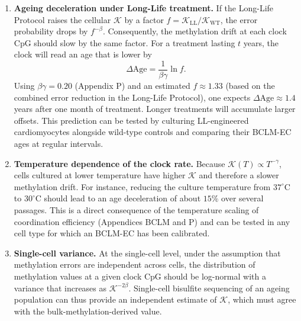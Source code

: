 \documentclass[12pt,a4paper]{article}
\newcommand{\REL}{\mathcal{K}}          %
\begin{document}
	\begin{enumerate}
		\item \textbf{Ageing deceleration under Long-Life treatment.}
		If the Long-Life Protocol raises the cellular \(\REL\) by a factor \(f = \REL_{\mathrm{LL}}/\REL_{\mathrm{WT}}\), the error probability drops by \(f^{-\beta}\). Consequently, the methylation drift at each clock CpG should slow by the same factor. For a treatment lasting \(t\) years, the clock will read an age that is lower by
		\[
		\Delta\mathrm{Age} = \frac{1}{\beta\gamma} \ln f.
		\]
		Using \(\beta\gamma = 0.20\) (Appendix P) and an estimated \(f \approx 1.33\) (based on the combined error reduction in the Long-Life Protocol), one expects \(\Delta\mathrm{Age} \approx 1.4\) years after one month of treatment. Longer treatments will accumulate larger offsets. This prediction can be tested by culturing LL-engineered cardiomyocytes alongside wild-type controls and comparing their BCLM-EC ages at regular intervals.
		
		\item \textbf{Temperature dependence of the clock rate.}
		Because \(\REL(T) \propto T^{-\gamma}\), cells cultured at lower temperature have higher \(\REL\) and therefore a slower methylation drift. For instance, reducing the culture temperature from \(37^\circ\text{C}\) to \(30^\circ\text{C}\) should lead to an age deceleration of about \(15\%\) over several passages. This is a direct consequence of the temperature scaling of coordination efficiency (Appendices BCLM and P) and can be tested in any cell type for which an BCLM-EC has been calibrated.
		
		\item \textbf{Single-cell variance.}
		At the single-cell level, under the assumption that methylation errors are independent across cells, the distribution of methylation values at a given clock CpG should be log-normal with a variance that increases as \(\REL^{-2\beta}\). Single-cell bisulfite sequencing of an ageing population can thus provide an independent estimate of \(\REL\), which must agree with the bulk-methylation-derived value.
	\end{enumerate}
	
\end{document}
